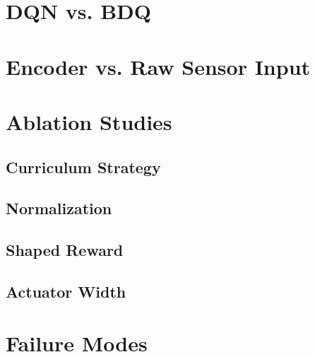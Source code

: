 





\section{DQN vs. BDQ}

\section{Encoder vs. Raw Sensor Input}

\section{Ablation Studies}

\subsection{Curriculum Strategy}

\subsection{Normalization}

\subsection{Shaped Reward}

\subsection{Actuator Width}

\section{Failure Modes}

